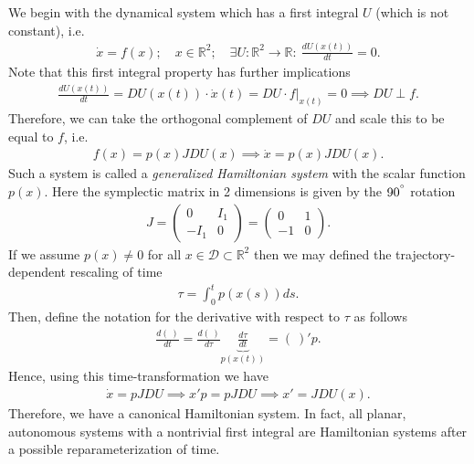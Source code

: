 \begin{ex}
	We begin with the dynamical system which has a first integral $U$ (which is not constant), i.e.
	\begin{align}
		\dot{x} = f(x);\quad x \in \mathbb{R}^{2};\quad \exists U:\mathbb{R}^{2}\to \mathbb{R}:\ \frac{dU(x(t))}{dt}=0.
	\end{align}
	Note that this first integral property has further implications
	\begin{align}
		\frac{dU(x(t))}{dt} = DU(x(t)) \cdot \dot{x}(t) = DU \cdot \left.f\right|_{x(t)} = 0 \implies DU \perp f.
	\end{align}
Therefore, we can take the orthogonal complement of $DU$ and scale this to be equal to $f$, i.e.
\begin{align}
	f(x) = p(x) JDU(x) \implies \dot{x} = p(x) JDU(x).
\end{align}
Such a system is called a \emph{generalized Hamiltonian system} with the scalar function $p(x)$. Here the symplectic matrix in 2 dimensions is given by the $90^{\degree}$ rotation
\begin{align}
	J = 
	\begin{pmatrix}
		0 & I_{1}\\
		-I_{1} & 0 
	\end{pmatrix}
	=
	\begin{pmatrix}
		0 & 1 \\
		-1 & 0
	\end{pmatrix}
	.
\end{align}
If we assume $p(x)\neq0$ for all $x\in \mathcal{D} \subset \mathbb{R}^{2}$ then we may defined the trajectory-dependent rescaling of time
\begin{align}
	\tau = \int_{0}^{t} p(x(s))ds.
\end{align}
Then, define the notation for the derivative with respect to $\tau$ as follows
 \begin{align}
	 \frac{d(\ )}{dt} = \frac{d(\ )}{d\tau} \underbrace{\frac{d\tau }{dt}}_{p(x(t))} = (\ )' p.
\end{align}
Hence, using this time-transformation we have
\begin{align}
	\dot{x} = pJDU \implies x'p = pJDU \implies \boxed{x' = JDU(x).}
\end{align}
Therefore, we have a canonical Hamiltonian system. In fact, all planar, autonomous systems with a nontrivial first integral are Hamiltonian systems after a possible reparameterization of time.
\end{ex}

